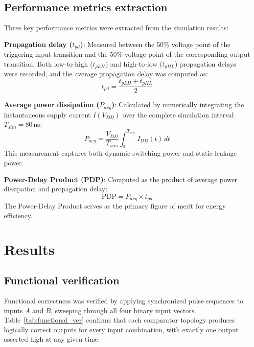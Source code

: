\documentclass[final,5p,times,twocolumn]{elsarticle}
\begin{document}
\subsection{Performance metrics extraction}

Three key performance metrics were extracted from the simulation results:

\textbf{Propagation delay ($t_{pd}$)}: Measured between the 50\% voltage point of the triggering input transition and the 50\% voltage point of the corresponding output transition. Both low-to-high ($t_{pLH}$) and high-to-low ($t_{pHL}$) propagation delays were recorded, and the average propagation delay was computed as:
\begin{equation}
    t_{pd} = \frac{t_{pLH} + t_{pHL}}{2}
    \label{eq:tpd}
\end{equation}

\textbf{Average power dissipation ($P_{avg}$)}: Calculated by numerically integrating the instantaneous supply current $I(V_{DD})$ over the complete simulation interval $T_{sim} = 80$\,ns:
\begin{equation}
    P_{avg} = \frac{V_{DD}}{T_{sim}} \int_{0}^{T_{sim}} I_{DD}(t) \, dt
    \label{eq:pavg}
\end{equation}
This measurement captures both dynamic switching power and static leakage power.

\textbf{Power-Delay Product (PDP)}: Computed as the product of average power dissipation and propagation delay:
\begin{equation}
    \text{PDP} = P_{avg} \times t_{pd}
    \label{eq:pdp}
\end{equation}
The Power-Delay Product serves as the primary figure of merit for energy efficiency.


\section{Results}
\label{sec:results}

\subsection{Functional verification}

Functional correctness was verified by applying synchronized pulse sequences to inputs $A$ and $B$, sweeping through all four binary input vectors. Table~\ref{tab:functional_ver} confirms that each comparator topology produces logically correct outputs for every input combination, with exactly one output asserted high at any given time.
\end{document}
